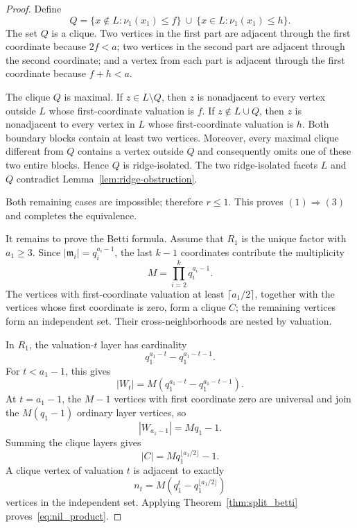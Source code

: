 \documentclass[12pt, reqno]{amsart}
\theoremstyle{definition}
\numberwithin{equation}{section}
\begin{document}
\begin{proof}
Define
\[
Q=
\{x\notin L:\nu_1(x_1)\le f\}
\ \cup\
\{x\in L:\nu_1(x_1)\le h\}.
\]
The set $Q$ is a clique.  Two vertices in the first part are adjacent through the first coordinate because $2f<a$; two vertices in the second part are adjacent through the second coordinate; and a vertex from each part is adjacent through the first coordinate because $f+h<a$.

The clique $Q$ is maximal.  If $z\in L\setminus Q$, then $z$ is nonadjacent to every vertex outside $L$ whose first-coordinate valuation is $f$.  If $z\notin L\cup Q$, then $z$ is nonadjacent to every vertex in $L$ whose first-coordinate valuation is $h$.  Both boundary blocks contain at least two vertices.  Moreover, every maximal clique different from $Q$ contains a vertex outside $Q$ and consequently omits one of these two entire blocks.  Hence $Q$ is ridge-isolated.  The two ridge-isolated facets $L$ and $Q$ contradict Lemma~\ref{lem:ridge-obstruction}.

Both remaining cases are impossible; therefore $r\le1$.  This proves $(1)\Rightarrow(3)$ and completes the equivalence.

It remains to prove the Betti formula.  Assume that $R_1$ is the unique factor with $a_1\ge3$.  Since $|\mathfrak m_i|=q_i^{a_i-1}$, the last $k-1$ coordinates contribute the multiplicity
\[
M=\prod_{i=2}^{k}q_i^{a_i-1}.
\]
The vertices with first-coordinate valuation at least $\lceil a_1/2\rceil$, together with the vertices whose first coordinate is zero, form a clique $C$; the remaining vertices form an independent set.  Their cross-neighborhoods are nested by valuation.

In $R_1$, the valuation-$t$ layer has cardinality
\[
q_1^{a_1-t}-q_1^{a_1-t-1}.
\]
For $t<a_1-1$, this gives
\[
|W_t|=M(q_1^{a_1-t}-q_1^{a_1-t-1}).
\]
At $t=a_1-1$, the $M-1$ vertices with first coordinate zero are universal and join the $M(q_1-1)$ ordinary layer vertices, so
\[
|W_{a_1-1}|=Mq_1-1.
\]
Summing the clique layers gives
\[
|C|=Mq_1^{\lfloor a_1/2\rfloor}-1.
\]
A clique vertex of valuation $t$ is adjacent to exactly
\[
n_t=M(q_1^t-q_1^{\lfloor a_1/2\rfloor})
\]
vertices in the independent set.  Applying Theorem~\ref{thm:split_betti} proves~\eqref{eq:nil_product}.
\end{proof}
\end{document}
